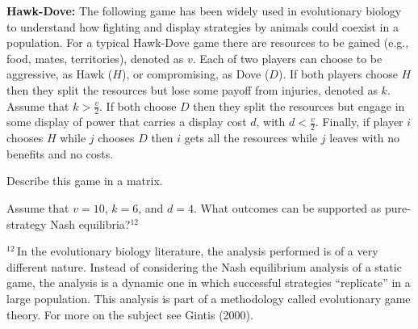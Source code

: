 

\textbf{Hawk-Dove:} The following game has been widely used in evolutionary biology to
understand how fighting and display strategies by animals could coexist in a population. For a
typical Hawk-Dove game there are resources to be gained (e.g., food, mates, territories), denoted as
$v$. Each of two players can choose to be aggressive, as Hawk ($H$), or compromising, as Dove ($D$).
If both players choose $H$ then they split the resources but lose some payoff from injuries,
denoted as $k$. Assume that $k > \frac{v}{2}$. If both choose $D$ then they split the resources but
engage in some display of power that carries a display cost $d$, with $d < \frac{v}{2}$. Finally, if
player $i$ chooses $H$ while $j$ chooses $D$ then $i$ gets all the resources while $j$ leaves with no
benefits and no costs.
\begin{partes}
\item Describe this game in a matrix.
\item Assume that $v = 10$, $k = 6$, and $d = 4$. What outcomes can be supported as pure-strategy
Nash equilibria?$^{12}$
\end{partes}
{\small $^{12}$\,In the evolutionary biology literature, the analysis performed is of a very
different nature. Instead of considering the Nash equilibrium analysis of a static game, the
analysis is a dynamic one in which successful strategies ``replicate'' in a large population. This
analysis is part of a methodology called evolutionary game theory. For more on the subject see
Gintis (2000).\par}
\resolespaco


